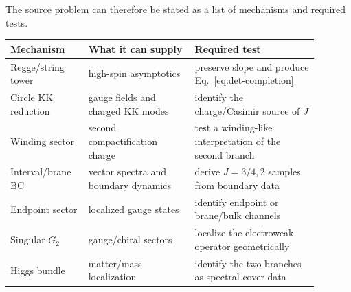 The source problem can therefore be stated as a list of mechanisms and required tests.
\begin{center}
\footnotesize
\begin{tabular}{p{0.22\linewidth}p{0.31\linewidth}p{0.36\linewidth}}
\toprule
Mechanism & What it can supply & Required test\\
\midrule
Regge/string tower & high-spin asymptotics & preserve slope and produce Eq.~\eqref{eq:det-completion}\\
Circle KK reduction & gauge fields and charged KK modes & identify the charge/Casimir source of \(J\)\\
Winding sector & second compactification charge & test a winding-like interpretation of the second branch\\
Interval/brane BC & vector spectra and boundary dynamics & derive \(J=3/4,2\) samples from boundary data\\
Endpoint sector & localized gauge states & identify endpoint or brane/bulk channels\\
Singular \(G_2\) & gauge/chiral sectors & localize the electroweak operator geometrically\\
Higgs bundle & matter/mass localization & identify the two branches as spectral-cover data\\
\bottomrule
\end{tabular}
\end{center}
